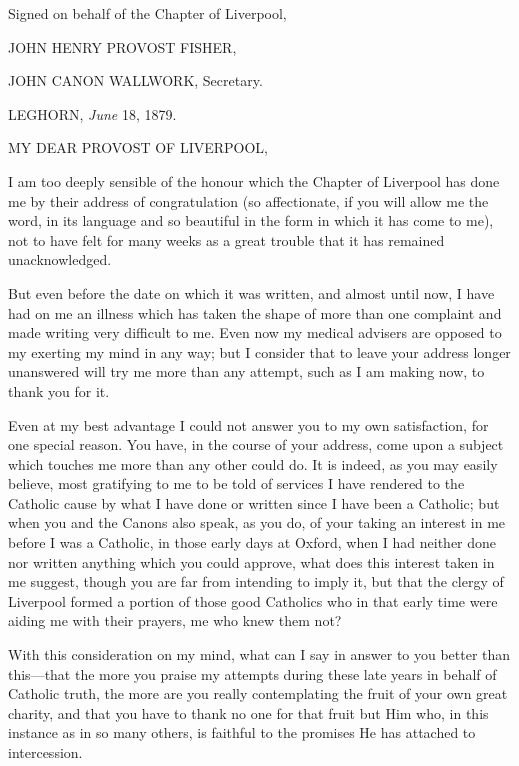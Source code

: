 Signed on behalf of the Chapter of Liverpool,

JOHN HENRY PROVOST
FISHER,

JOHN CANON WALLWORK,
Secretary.


LEGHORN, \emph{June} 18, 1879.

MY DEAR PROVOST
OF LIVERPOOL,

I am too deeply sensible of the honour which the Chapter of Liverpool
has done me by their address of congratulation (so affectionate, if
you will allow me the word, in its language and so beautiful in the
form in which it has come to me), not to have felt for many weeks as a
great trouble that it has remained unacknowledged.

But even before the date on which it was written, and almost until
now, I have had on me an illness which has taken the shape of more
than one complaint and made writing very difficult to me. Even now my
medical advisers are opposed to my exerting my mind in any way; but I
consider that to leave your address longer unanswered will try me more
than any attempt, such as I am making now, to thank you for it.

Even at my best advantage I could not answer you to my own
satisfaction, for one special reason. You have, in the course of your
address, come upon a subject which touches me more than any other
could do. It is indeed, as you may easily believe, most gratifying to
me to be told of services I have rendered to the Catholic cause by
what I have done or written since I have been a Catholic; but when you
and the Canons also speak, as you do, of your taking an interest in me
before I was a Catholic, in those early days at Oxford, when I had
neither done nor written anything which you could approve, what does
this interest taken in me suggest, though you are far from intending
to imply it, but that the clergy of Liverpool formed a portion of
those good Catholics who in that early time were aiding me with their
prayers, me who knew them not?

With this consideration on my mind, what can I say in answer to you
better than this—that the more you praise my attempts during these
late years in behalf of Catholic truth, the more are you really
contemplating the fruit of your own great charity, and that you have
to thank no one for that fruit but Him who, in this instance as in so
many others, is faithful to the promises He has attached to
intercession.

